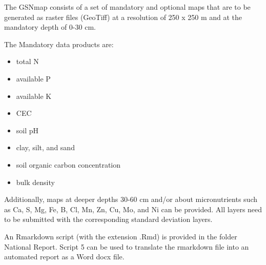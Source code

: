 \documentclass[
  10pt,
  b5paper,
  oneside]{book}
\providecommand{\tightlist}{%
  \setlength{\itemsep}{0pt}\setlength{\parskip}{0pt}}
\begin{document}
The GSNmap consists of a set of mandatory and optional maps that are to be generated as raster files (GeoTiff) at a resolution of 250 x 250 m and at the mandatory depth of 0-30 cm.

The Mandatory data products are:

\begin{itemize}
\tightlist
\item
  total N
\item
  available P
\item
  available K
\item
  CEC
\item
  soil pH
\item
  clay, silt, and sand
\item
  soil organic carbon concentration
\item
  bulk density
\end{itemize}

Additionally, maps at deeper depths 30-60 cm and/or about micronutrients such as Ca, S, Mg, Fe, B, Cl, Mn, Zn, Cu, Mo, and Ni can be provided. All layers need to be submitted with the corresponding standard deviation layers.

An Rmarkdown script (with the extension .Rmd) is provided in the folder National Report. Script 5 can be used to translate the rmarkdown file into an automated report as a Word docx file.
\end{document}
